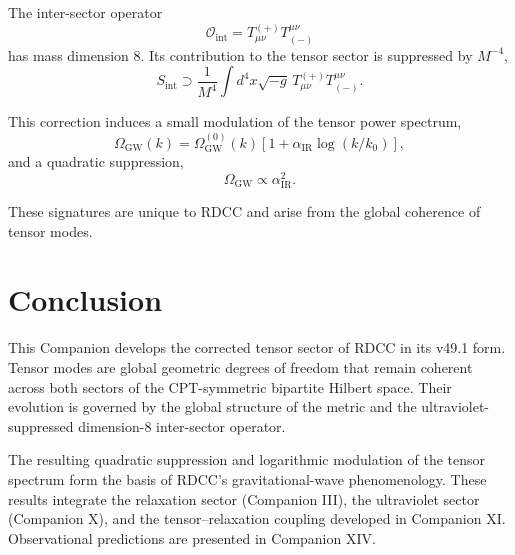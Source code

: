 \documentclass[11pt,a4paper]{article}
\begin{document}
The inter-sector operator
\begin{equation}
\mathcal{O}_{\mathrm{int}} = T^{(+)}_{\mu\nu} T_{(-)}^{\mu\nu}
\end{equation}
has mass dimension 8. Its contribution to the tensor sector is suppressed by
$M^{-4}$,
\begin{equation}
S_{\mathrm{int}} \supset
\frac{1}{M^4} \int d^4x \sqrt{-g} \,
T^{(+)}_{\mu\nu} T_{(-)}^{\mu\nu}.
\end{equation}

This correction induces a small modulation of the tensor power spectrum,
\begin{equation}
\Omega_{\mathrm{GW}}(k)
=
\Omega_{\mathrm{GW}}^{(0)}(k)
\left[ 1 + \alpha_{\mathrm{IR}} \log(k/k_0) \right],
\end{equation}
and a quadratic suppression,
\begin{equation}
\Omega_{\mathrm{GW}} \propto \alpha_{\mathrm{IR}}^2.
\end{equation}

These signatures are unique to RDCC and arise from the global coherence of
tensor modes.

\section{Conclusion}

This Companion develops the corrected tensor sector of RDCC in its v49.1 form.
Tensor modes are global geometric degrees of freedom that remain coherent across
both sectors of the CPT-symmetric bipartite Hilbert space. Their evolution is
governed by the global structure of the metric and the ultraviolet-suppressed
dimension-8 inter-sector operator.

The resulting quadratic suppression and logarithmic modulation of the tensor
spectrum form the basis of RDCC's gravitational-wave phenomenology. These
results integrate the relaxation sector (Companion III), the ultraviolet sector
(Companion X), and the tensor–relaxation coupling developed in Companion XI.
Observational predictions are presented in Companion XIV.
\end{document}

